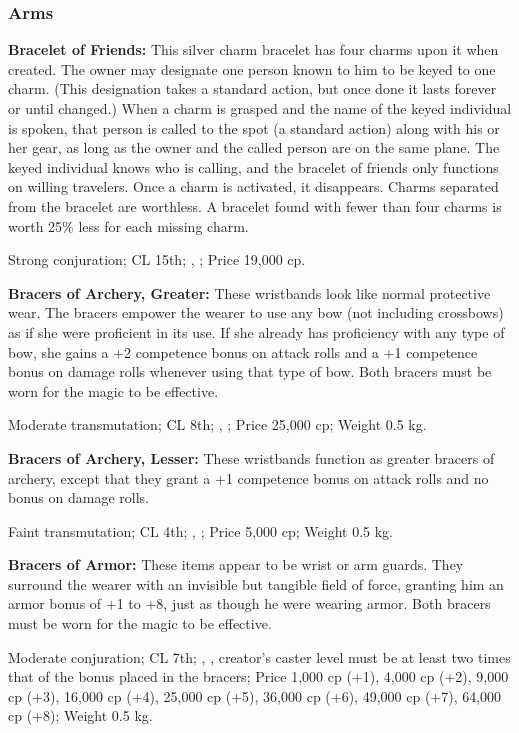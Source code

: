 \subsubsection{Arms}

\textbf{Bracelet of Friends:} This silver charm bracelet has four charms upon it when created. The owner may designate one person known to him to be keyed to one charm. (This designation takes a standard action, but once done it lasts forever or until changed.) When a charm is grasped and the name of the keyed individual is spoken, that person is called to the spot (a standard action) along with his or her gear, as long as the owner and the called person are on the same plane. The keyed individual knows who is calling, and the bracelet of friends only functions on willing travelers. Once a charm is activated, it disappears. Charms separated from the bracelet are worthless. A bracelet found with fewer than four charms is worth 25\% less for each missing charm.

Strong conjuration; CL 15th; , ; Price 19,000 cp.

\textbf{Bracers of Archery, Greater:} These wristbands look like normal protective wear. The bracers empower the wearer to use any bow (not including crossbows) as if she were proficient in its use. If she already has proficiency with any type of bow, she gains a +2 competence bonus on attack rolls and a +1 competence bonus on damage rolls whenever using that type of bow. Both bracers must be worn for the magic to be effective.

Moderate transmutation; CL 8th; , ; Price 25,000 cp; Weight 0.5 kg.

\textbf{Bracers of Archery, Lesser:} These wristbands function as greater bracers of archery, except that they grant a +1 competence bonus on attack rolls and no bonus on damage rolls.

Faint transmutation; CL 4th; , ; Price 5,000 cp; Weight 0.5 kg.

\textbf{Bracers of Armor:} These items appear to be wrist or arm guards. They surround the wearer with an invisible but tangible field of force, granting him an armor bonus of +1 to +8, just as though he were wearing armor. Both bracers must be worn for the magic to be effective.

Moderate conjuration; CL 7th; , , creator's caster level must be at least two times that of the bonus placed in the bracers; Price 1,000 cp (+1), 4,000 cp (+2), 9,000 cp (+3), 16,000 cp (+4), 25,000 cp (+5), 36,000 cp (+6), 49,000 cp (+7), 64,000 cp (+8); Weight 0.5 kg.
